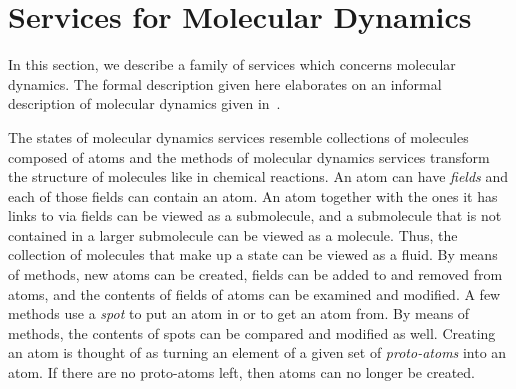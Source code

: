 \documentclass[fleqn]{llncs}
\begin{document}
\section{Services for Molecular Dynamics}
\label{sect-MDS}

In this section, we describe a family of services which concerns
molecular dynamics.
The formal description given here elaborates on an informal description
of molecular dynamics given in~\cite{BB02a}.

The states of molecular dynamics services resemble collections of
molecules composed of atoms and the methods of molecular dynamics
services transform the structure of molecules like in chemical
reactions.
An atom can have \emph{fields} and each of those fields can contain an
atom.
An atom together with the ones it has links to via fields can be viewed
as a submolecule, and a submolecule that is not contained in a larger
submolecule can be viewed as a molecule.
Thus, the collection of molecules that make up a state can be viewed as
a fluid.
By means of methods, new atoms can be created, fields can be added to
and removed from atoms, and the contents of fields of atoms can be
examined and modified.
A few methods use a \emph{spot} to put an atom in or to get an atom
from.
By means of methods, the contents of spots can be compared and modified
as well.
Creating an atom is thought of as turning an element of a given set of
\emph{proto-atoms} into an atom.
If there are no proto-atoms left, then atoms can no longer be created.
\end{document}
